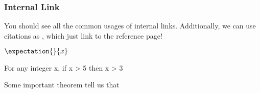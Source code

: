 \subsubsection{Internal Link}
You should see all the common usages of internal links. Additionally, we can use citations as \cite{newton1726philosophiae}, which just link
to the reference page!

\(\expectation{}{x}\) 
\hr
\conta
\begin{theorem}
	For any integer x, if x > 5 then x > 3
\end{theorem}
Some important theorem  tell us that